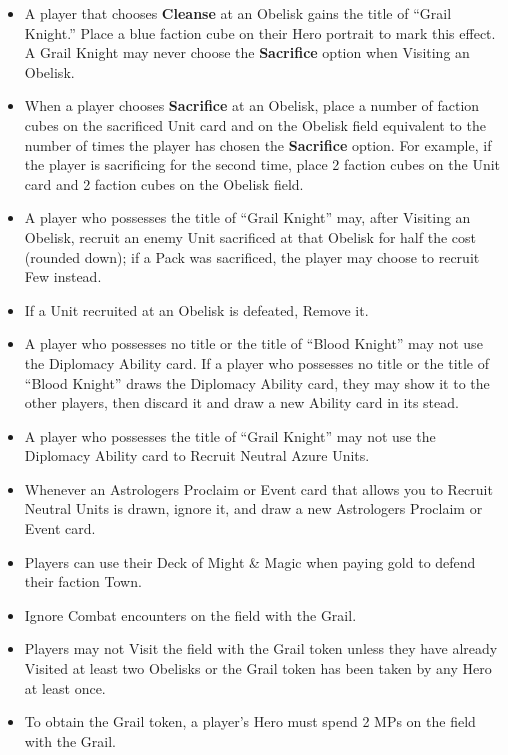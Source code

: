 \begin{multicols*}{2}
\begin{itemize}
  \item A player that chooses \textbf{Cleanse} at an Obelisk gains the title of ``\textcolor{darkcerulean}{Grail Knight}.'' Place a blue faction cube on their Hero portrait to mark this effect. A \textcolor{darkcerulean}{Grail Knight} may never choose the \textbf{Sacrifice} option when Visiting an Obelisk.
  \item When a player chooses \textbf{Sacrifice} at an Obelisk, place a number of faction cubes on the sacrificed Unit card and on the Obelisk field equivalent to the number of times the player has chosen the \textbf{Sacrifice} option. For example, if the player is sacrificing for the second time, place 2 faction cubes on the Unit card and 2 faction cubes on the Obelisk field.
  \item A player who possesses the title of ``\textcolor{darkcerulean}{Grail Knight}'' may, after Visiting an Obelisk, recruit an enemy Unit sacrificed at that Obelisk for half the cost (rounded down); if a Pack was sacrificed, the player may choose to recruit Few instead.
  \item If a Unit recruited at an Obelisk is defeated, Remove it.
  \item A player who possesses no title or the title of ``\textcolor{darkcandyapplered}{Blood Knight}'' may not use the Diplomacy Ability card. If a player who possesses no title or the title of ``\textcolor{darkcandyapplered}{Blood Knight}'' draws the Diplomacy Ability card, they may show it to the other players, then discard it and draw a new Ability card in its stead.
  \item A player who possesses the title of ``\textcolor{darkcerulean}{Grail Knight}'' may not use the Diplomacy Ability card to Recruit Neutral Azure Units.
  \item Whenever an Astrologers Proclaim or Event card that allows you to Recruit Neutral Units is drawn, ignore it, and draw a new Astrologers Proclaim or Event card.
  \item Players can use their Deck of Might \& Magic when paying gold to defend their faction Town.
  \item Ignore Combat encounters on the field with the Grail.
  \item Players may not Visit the field with the Grail token unless they have already Visited at least two Obelisks or the Grail token has been taken by any Hero at least once.
  \item To obtain the Grail token, a player’s Hero must spend 2 MPs on the field with the Grail.

\end{itemize}
\end{multicols*}
